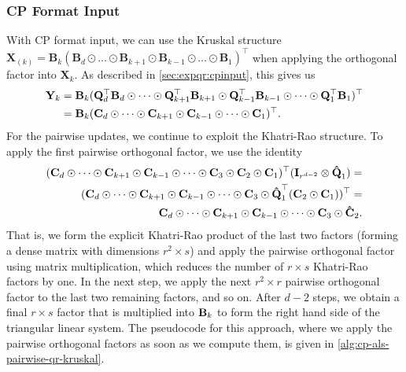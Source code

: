 \documentclass{article}
\newcommand{\mat}[1]{\mathbf{#1}}
\newcommand{\M}[2][]{\bm{#1{\mathbf{\MakeUppercase{#2}}}}} 		%
\begin{document}
\subsubsection{CP Format Input} 
\label{sec:QR-PW-k}

With CP format input, we can use the Kruskal structure $\mat{X}_{(k)} = \mat{B}_{k}(\mat{B}_{d} \odot \dots \odot \mat{B}_{k+1} \odot \mat{B}_{k-1}  \odot \dots \odot \mat{B}_{1})^\top$ when applying the orthogonal factor into $\mat{X}_k$. 
As described in \cref{sec:expqr:cpinput}, this gives us
\begin{align*}
  \mat{Y}_k &= \mat{B}_k(\mat{Q}_d^\top\mat{B}_d \odot \cdots \odot \mat{Q}_{k+1}^\top\mat{B}_{k+1} \odot \mat{Q}_{k-1}^\top\mat{B}_{k-1} \odot \cdots \odot \mat{Q}_1^\top\mat{B}_1)^\top \\
  &= \mat{B}_k(\mat{C}_d \odot \cdots \odot \mat{C}_{k+1} \odot \M{C}_{k-1} \odot \cdots \odot \M{C}_1)^\top.
\end{align*}
For the pairwise updates, we continue to exploit the Khatri-Rao structure.
To apply the first pairwise orthogonal factor, we use the identity
\begin{align*}
(\M{C}_d \odot \cdots \odot \M{C}_{k+1} \odot \M{C}_{k-1} \odot \cdots \odot \M{C}_3 \odot \M{C}_2 \odot \M{C}_1)^\top(\M{I}_{r^{d-2}} \otimes \M[\hat]{Q}_1) = \\
(\M{C}_d \odot \cdots \odot \M{C}_{k+1} \odot \M{C}_{k-1} \odot \cdots \odot \M{C}_3 \odot \M[\hat]{Q}_1^\top(\M{C}_2 \odot \M{C}_1))^\top = \\
\M{C}_d \odot \cdots \odot \M{C}_{k+1} \odot \M{C}_{k-1} \odot \cdots \odot \M{C}_3 \odot \M[\hat]{C}_2.
\end{align*}
That is, we form the explicit Khatri-Rao product of the last two factors (forming a dense matrix with dimensions $r^2 \times s$) and apply the pairwise orthogonal factor using matrix multiplication, which reduces the number of $r \times s$ Khatri-Rao factors by one.
In the next step, we apply the next $r^2 \times r$ pairwise orthogonal factor to the last two remaining factors, and so on.
After $d-2$ steps, we obtain a final $r\times s$ factor that is multiplied into $\M{B}_k$ to form the right hand side of the triangular linear system.
The pseudocode for this approach, where we apply the pairwise orthogonal factors as soon as we compute them, is given in \cref{alg:cp-als-pairwise-qr-kruskal}.
\end{document}
